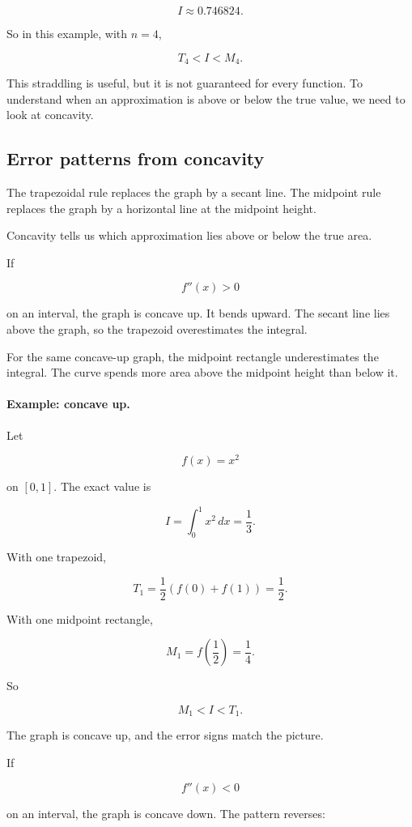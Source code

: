 \[
I\approx 0.746824.
\]

So in this example, with \(n=4\),

\[
T_4<I<M_4.
\]

This straddling is useful, but it is not guaranteed for every function.  To understand when
an approximation is above or below the true value, we need to look at concavity.

\subsection{Error patterns from concavity}
\label{subsec:error-patterns-from-concavity}

The trapezoidal rule replaces the graph by a secant line.  The midpoint rule replaces the
graph by a horizontal line at the midpoint height.

Concavity tells us which approximation lies above or below the true area.

If

\[
f''(x)>0
\]

on an interval, the graph is concave up.  It bends upward.  The secant line lies above the
graph, so the trapezoid overestimates the integral.

For the same concave-up graph, the midpoint rectangle underestimates the integral.  The
curve spends more area above the midpoint height than below it.

\paragraph{Example: concave up.}
Let

\[
f(x)=x^2
\]

on \([0,1]\).  The exact value is

\[
I=\int_0^1 x^2\,dx=\frac13.
\]

With one trapezoid,

\[
T_1=\frac12(f(0)+f(1))=\frac12.
\]

With one midpoint rectangle,

\[
M_1=f\left(\frac12\right)=\frac14.
\]

So

\[
M_1<I<T_1.
\]

The graph is concave up, and the error signs match the picture.

If

\[
f''(x)<0
\]

on an interval, the graph is concave down.  The pattern reverses:

